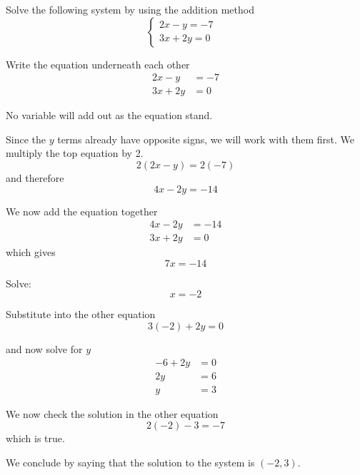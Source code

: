 \begin{myexample}
Solve the following system by using the addition method
\[
	\begin{cases}
		2x-y  =-7 &   \\
		3x+2y =0  &   
	\end{cases}
\]
\end{myexample}
\begin{myProof}
	\begin{steps}
		\item Write the equation underneath each other
		\begin{align*}
			2x-y  & =-7 \\
			3x+2y & =0  
		\end{align*} 
		\item No variable will add out as the equation stand.
		\item Since the $y$ terms already have opposite signs, we will work
		with them first. We multiply the top equation by 2.
		\[
			2(2x-y)=2(-7)
		\]
		and therefore
		\[
			4x-2y=-14
		\]
		\item We now add the equation together
		\begin{align*}
			4x-2y & =-14 \\
			3x+2y & =0   
		\end{align*}
		which gives
		\[
			7x = -14
		\]
		\item Solve:
		\[
			x = -2
		\]
		\item Substitute into the other equation
		\[
			3(-2)+2y=0
		\]
		\item and now solve for $y$
		\begin{align*}
			-6+2y & = 0 \\
			2y    & = 6 \\
			y     & = 3 
		\end{align*} 
		{}
		\item We now check the solution in the other equation
		\[
			2(-2)-3 = -7
		\]
		which is true.
		\item We conclude by saying that the solution to the system is $(-2,3)$.
	\end{steps} 
\end{myProof} 
																																																														
